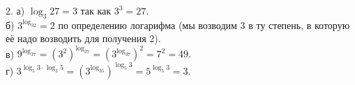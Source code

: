2. а) $\log_3 27=3$ так как $3^3=27.$\\
б) $3^{\log_32}=2$ по определению логарифма (мы возводим 3 в ту степень, в которую её надо возводить для получения 2).\\
в) $9^{\log_37}=(3^2)^{\log_37}=(3^{\log_37})^2=7^2=49.$\\
г) $3^{\log_5 3\cdot\log_3 5}=(3^{\log_35})^{\log_5 3}=5^{\log_5 3}=3.$\\
